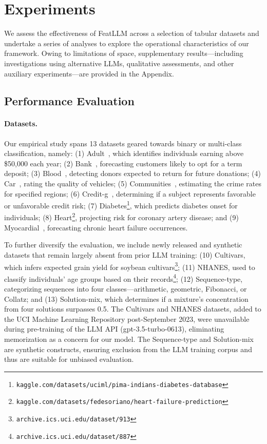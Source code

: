 \section{Experiments}
We assess the effectiveness of \textsf{FeatLLM} across a selection of tabular datasets and undertake a series of analyses to explore the operational characteristics of our framework. Owing to limitations of space, supplementary results—including investigations using alternative LLMs, qualitative assessments, and other auxiliary experiments—are provided in the Appendix.

\subsection{Performance Evaluation}
\paragraph{Datasets.}
Our empirical study spans 13 datasets geared towards binary or multi-class classification, namely: (1) Adult~\cite{asuncion2007uci}, which identifies individuals earning above \$50,000 each year; (2) Bank~\cite{moro2014data}, forecasting customers likely to opt for a term deposit; (3) Blood~\cite{yeh2009knowledge}, detecting donors expected to return for future donations; (4) Car~\cite{kadra2021well}, rating the quality of vehicles; (5) Communities~\cite{misc_communities_and_crime_183}, estimating the crime rates for specified regions; (6) Credit-g~\cite{kadra2021well}, determining if a subject represents favorable or unfavorable credit risk; (7) Diabetes\footnote{\texttt{kaggle.com/datasets/uciml/pima-indians-diabetes-database}}, which predicts diabetes onset for individuals; (8) Heart\footnote{\texttt{kaggle.com/datasets/fedesoriano/heart-failure-prediction}}, projecting risk for coronary artery disease; and (9) Myocardial~\cite{misc_myocardial_infarction_complications_579}, forecasting chronic heart failure occurrences.

To further diversify the evaluation, we include newly released and synthetic datasets that remain largely absent from prior LLM training: (10) Cultivars, which infers expected grain yield for soybean cultivars\footnote{\texttt{archive.ics.uci.edu/dataset/913}}; (11) NHANES, used to classify individuals' age groups based on their records\footnote{\texttt{archive.ics.uci.edu/dataset/887}}; (12) Sequence-type, categorizing sequences into four classes—arithmetic, geometric, Fibonacci, or Collatz; and (13) Solution-mix, which determines if a mixture's concentration from four solutions surpasses 0.5. The Cultivars and NHANES datasets, added to the UCI Machine Learning Repository post-September 2023, were unavailable during pre-training of the LLM API (gpt-3.5-turbo-0613), eliminating memorization as a concern for our model. The Sequence-type and Solution-mix are synthetic constructs, ensuring exclusion from the LLM training corpus and thus are suitable for unbiased evaluation.

